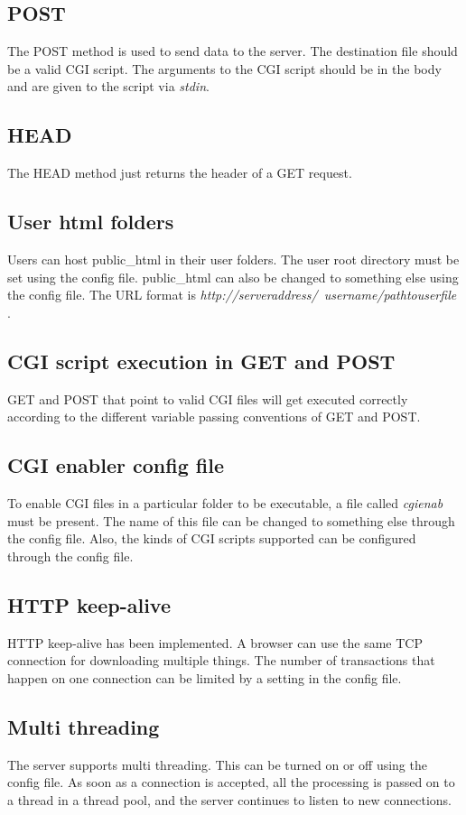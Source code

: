 \documentclass[12pt,a4paper,final]{article}
\begin{document}
\subsection{POST}
The POST method is used to send data to the server. The destination file should be a valid CGI script. The arguments to the CGI script should be in the body and are given to the script via \emph{stdin}. 
\subsection{HEAD}
The HEAD method just returns the header of a GET request. 
\subsection{User html folders}
Users can host public\_html in their user folders. The user root directory must be set using the config file. public\_html can also be changed to something else using the config file. The URL format is \emph{http://serveraddress/~username/pathtouserfile} . 
\subsection{CGI script execution in GET and POST}
GET and POST that point to valid CGI files will get executed correctly according to the different variable passing conventions of GET and POST. 
\subsection{CGI enabler config file}
To enable CGI files in a particular folder to be executable, a file called \emph{cgienab} must be present. The name of this file can be changed to something else through the config file. Also, the kinds of CGI scripts supported can be configured through the config file.
\subsection{HTTP keep-alive}
HTTP keep-alive has been implemented. A browser can use the same TCP connection for downloading multiple things. The number of transactions that happen on one connection can be limited by a setting in the config file.
\subsection{Multi threading}
The server supports multi threading. This can be turned on or off using the config file. As soon as a connection is accepted, all the processing is passed on to a thread in a thread pool, and the server continues to listen to new connections.
\end{document}
